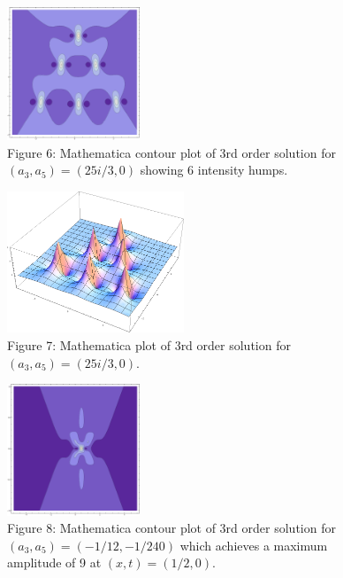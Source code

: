 \documentclass{beamer}
\theoremstyle{plain}
\theoremstyle{definition}
\begin{document}
\frame
{
\vspace{0mm}
\begin{figure}
\begin{center}
\includegraphics[width=150px]{3rd_order_many_peaks_contour.png}\\
Figure 6: Mathematica contour plot of 3rd order solution for $(a_3,a_5)=(25i/3,0)$ showing 6 intensity humps.
\end{center}
\end{figure}
}

\frame
{
\begin{figure}
\begin{center}
\includegraphics[width=200px]{3rd_order_many_peaks.png}\\
Figure 7: Mathematica plot of 3rd order solution for $(a_3,a_5)=(25i/3,0)$.
\end{center}
\end{figure}
\vspace{-1mm}
}

\frame
{
\begin{figure}
\begin{center}
\includegraphics[width=150px]{3rd_order_max_peak_contour.png}\\
Figure 8: Mathematica contour plot of 3rd order solution for $(a_3,a_5)=(-1/12,-1/240)$ which achieves a maximum amplitude of 9 at $(x,t)=(1/2,0)$.
\end{center}
\end{figure}
\vspace{-1mm}
}
\end{document}
